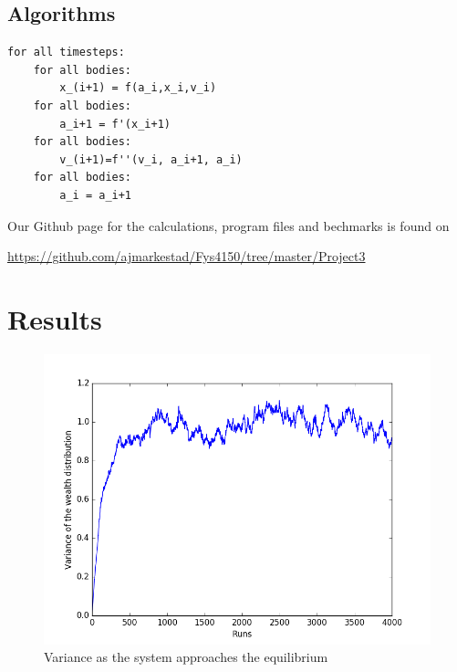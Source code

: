 \documentclass[a4paper,11pt]{article}
\begin{document}
{\subsection*{Algorithms}

\begin{lstlisting}
for all timesteps:
	for all bodies:
		x_(i+1) = f(a_i,x_i,v_i)
	for all bodies:
		a_i+1 = f'(x_i+1)
	for all bodies:
		v_(i+1)=f''(v_i, a_i+1, a_i)
	for all bodies:
		a_i = a_i+1
\end{lstlisting}Our Github page for the calculations, program files and bechmarks is found on 

\url{https://github.com/ajmarkestad/Fys4150/tree/master/Project3}


\section*{Results}



\begin{figure}[H]
	\centering
	\includegraphics[scale=0.5]{testinit}
	\caption{Variance as the system approaches the equilibrium}
	\label{fig:testinit}
\end{figure}


}
\end{document}
